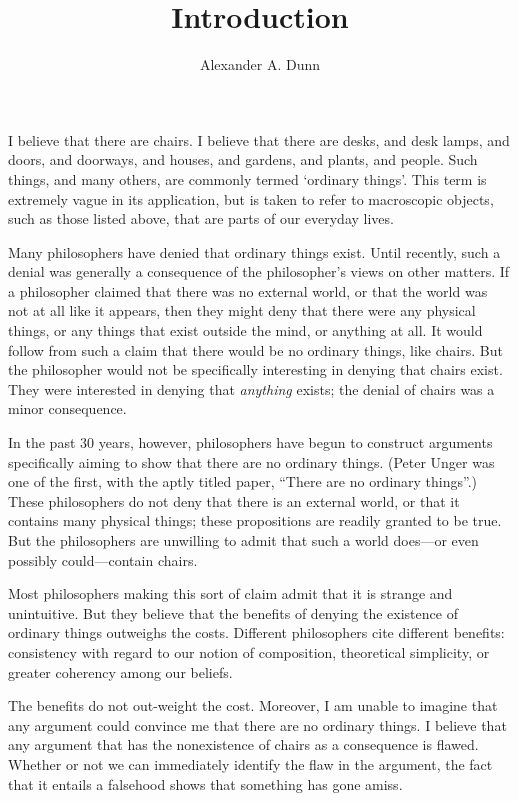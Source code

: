 \documentclass[11pt]{article}
\title{Introduction}
\author{Alexander A. Dunn}
\begin{document}
\ifstandalone
\maketitle
\begin{spacing}{1.25}
\fi

I believe that there are chairs.  I believe that there are desks, and
desk lamps, and doors, and doorways, and houses, and gardens, and
plants, and people.  Such things, and many others, are commonly termed
`ordinary things'.  This term is extremely vague in its application,
but is taken to refer to macroscopic objects, such as those listed
above, that are parts of our everyday lives.

Many philosophers have denied that ordinary things exist.  Until
recently, such a denial was generally a consequence of the
philosopher's views on other matters.  If a philosopher claimed that
there was no external world, or that the world was not at all like it
appears, then they might deny that there were any physical things, or
any things that exist outside the mind, or anything at all.  It would
follow from such a claim that there would be no ordinary things, like
chairs.  But the philosopher would not be specifically interesting in
denying that chairs exist.  They were interested in denying that {\em
  anything} exists; the denial of chairs was a minor consequence.

In the past 30 years, however, philosophers have begun to construct
arguments specifically aiming to show that there are no ordinary
things.  (Peter Unger was one of the first, with the aptly titled
paper, ``There are no ordinary things''.)  These philosophers do not
deny that there is an external world, or that it contains many
physical things; these propositions are readily granted to be true.
But the philosophers are unwilling to admit that such a world
does---or even possibly could---contain chairs.

Most philosophers making this sort of claim admit that it is strange
and unintuitive.  But they believe that the benefits of denying the
existence of ordinary things outweighs the costs.  Different
philosophers cite different benefits: consistency with regard to our
notion of composition, theoretical simplicity, or greater coherency
among our beliefs.  

The benefits do not out-weight the cost.  Moreover, I am unable to
imagine that any argument could convince me that there are no ordinary
things.  I believe that any argument that has the nonexistence of
chairs as a consequence is flawed.  Whether or not we can immediately
identify the flaw in the argument, the fact that it entails a
falsehood shows that something has gone amiss.


\end{spacing}
\end{document}
